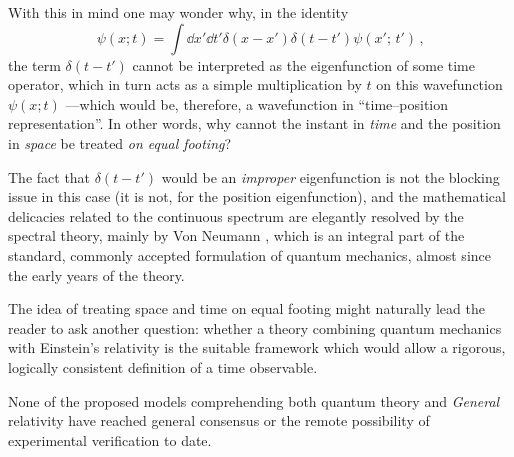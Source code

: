 With this in mind one may wonder why, in the identity
\begin{equation}\label{eq:diracdeltaxt}
  \psi(x; t) = \int \dd{x'}\dd{t'} \delta(x-x')\delta(t-t') \psi(x';\, t') \,\text{,}
\end{equation}
the term $\delta(t-t')$ cannot be interpreted as the eigenfunction of some time operator,
which in turn acts as a simple multiplication by $t$ on this
wavefunction $\psi(x; t)$ ---which would be, therefore, a wavefunction in ``time--position representation''.
In other words, why cannot the instant in \emph{time} and the position in \emph{space} be treated
\emph{on equal footing}?

The fact that $\delta(t-t')$ would be an \emph{improper} eigenfunction
is not the blocking issue in this case (it is not, for the position eigenfunction),
and the mathematical delicacies related to the continuous spectrum are
elegantly resolved by the spectral theory, mainly by Von Neumann
\parencite{VonNeumann}, which is an integral part of the standard, commonly accepted
formulation of quantum mechanics, almost since the early years of the theory.

The idea of treating space and time on equal footing might naturally lead the reader to
ask another question: whether a theory combining quantum mechanics with Einstein's
relativity is the suitable framework which would allow a rigorous, logically consistent
definition of a time observable.

None of the proposed models comprehending both quantum theory and \emph{General} relativity
have reached general consensus or the remote possibility of experimental verification to date.
